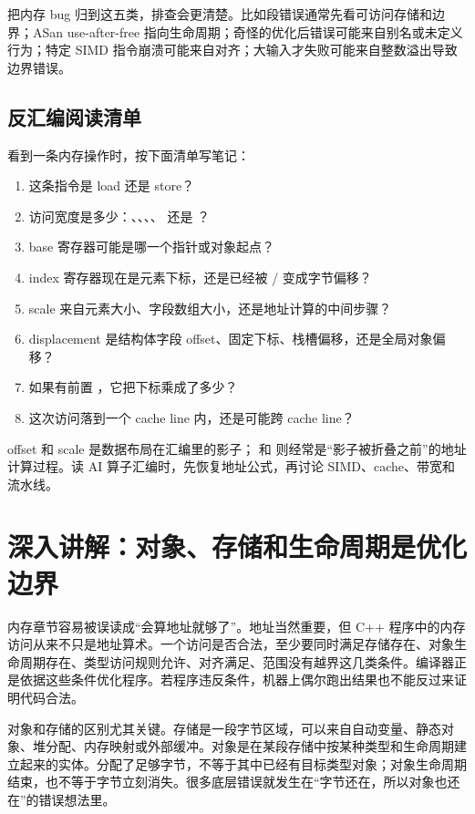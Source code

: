 把内存 bug 归到这五类，排查会更清楚。比如段错误通常先看可访问存储和边界；ASan use-after-free 指向生命周期；奇怪的优化后错误可能来自别名或未定义行为；特定 SIMD 指令崩溃可能来自对齐；大输入才失败可能来自整数溢出导致边界错误。

\subsection{反汇编阅读清单}

看到一条内存操作时，按下面清单写笔记：

\begin{enumerate}
  \item 这条指令是 load 还是 store？
  \item 访问宽度是多少：、、、、 还是 ？
  \item base 寄存器可能是哪一个指针或对象起点？
  \item index 寄存器现在是元素下标，还是已经被 / 变成字节偏移？
  \item scale 来自元素大小、字段数组大小，还是地址计算的中间步骤？
  \item displacement 是结构体字段 offset、固定下标、栈槽偏移，还是全局对象偏移？
  \item 如果有前置 ，它把下标乘成了多少？
  \item 这次访问落到一个 cache line 内，还是可能跨 cache line？
\end{enumerate}

\begin{keyidea}
offset 和 scale 是数据布局在汇编里的影子； 和  则经常是“影子被折叠之前”的地址计算过程。读 AI 算子汇编时，先恢复地址公式，再讨论 SIMD、cache、带宽和流水线。
\end{keyidea}

\section{深入讲解：对象、存储和生命周期是优化边界}

内存章节容易被误读成“会算地址就够了”。地址当然重要，但 C++ 程序中的内存访问从来不只是地址算术。一个访问是否合法，至少要同时满足存储存在、对象生命周期存在、类型访问规则允许、对齐满足、范围没有越界这几类条件。编译器正是依据这些条件优化程序。若程序违反条件，机器上偶尔跑出结果也不能反过来证明代码合法。

对象和存储的区别尤其关键。存储是一段字节区域，可以来自自动变量、静态对象、堆分配、内存映射或外部缓冲。对象是在某段存储中按某种类型和生命周期建立起来的实体。分配了足够字节，不等于其中已经有目标类型对象；对象生命周期结束，也不等于字节立刻消失。很多底层错误就发生在“字节还在，所以对象也还在”的错误想法里。

